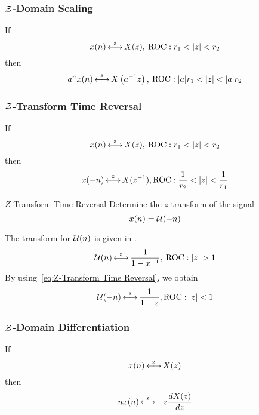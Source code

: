 \subsubsection{\texorpdfstring{$\operatorname{\mathcal{Z}}$-Domain}{Z-Domain} Scaling}\label{subsubsec:Z-Domain Scaling}
If
\begin{equation*}
  x(n) \operatorname{\overset{z}{\longleftrightarrow}} X(z), \> \operatorname{\mathrm{ROC}}: r_{1}< \lvert z \rvert < r_{2}
\end{equation*}
then
\begin{equation}\label{eq:Z-Domain Scaling}
  a^{n}x(n) \operatorname{\overset{z}{\longleftrightarrow}} X \left( a^{-1}z \right), \> \operatorname{\mathrm{ROC}}: \lvert a \rvert r_{1} < \lvert z \rvert < \lvert a \rvert r_{2}
\end{equation}

\subsubsection{\texorpdfstring{$\operatorname{\mathcal{Z}}$-Transform}{Z-Transform} Time Reversal}\label{subsubsec:Z-Transform Time Reversal}
If
\begin{equation*}
  x(n) \operatorname{\overset{z}{\longleftrightarrow}} X(z), \> \operatorname{\mathrm{ROC}}: r_{1}< \lvert z \rvert < r_{2}
\end{equation*}
then
\begin{equation}\label{eq:Z-Transform Time Reversal}
  x(-n) \operatorname{\overset{z}{\longleftrightarrow}} X(z^{-1}), \operatorname{\mathrm{ROC}}: \frac{1}{r_{2}} < \lvert z \rvert < \frac{1}{r_{1}}
\end{equation}

\begin{example}[Example 3.2.6]{\texorpdfstring{$Z$-Transform}{Z-Transform} Time Reversal}
  Determine the $z$-transform of the signal
  \begin{equation*}
    x(n) = \operatorname{\mathcal{U}}(-n)
  \end{equation*}

  \tcblower

  The transform for $\operatorname{\mathcal{U}}(n)$ is given in .
  \begin{equation*}
    \operatorname{\mathcal{U}}(n) \operatorname{\overset{z}{\longleftrightarrow}} \frac{1}{1-x^{-1}}, \> \operatorname{\mathrm{ROC}}: \lvert z \rvert > 1
  \end{equation*}
  By using~\eqref{eq:Z-Transform Time Reversal}, we obtain
  \begin{equation*}
    \operatorname{\mathcal{U}}(-n) \operatorname{\overset{z}{\longleftrightarrow}} \frac{1}{1-z}, \operatorname{\mathrm{ROC}}: \lvert z \rvert < 1
  \end{equation*}
\end{example}

\subsubsection{\texorpdfstring{$\operatorname{\mathcal{Z}}$-Domain}{Z-Domain} Differentiation}\label{subsubsec:Z-Domain Differentiation}
If
\begin{equation*}
  x(n) \operatorname{\overset{z}{\longleftrightarrow}} X(z)
\end{equation*}
then
\begin{equation}\label{eq:Z-Domain Differentiation}
  nx(n) \operatorname{\overset{z}{\longleftrightarrow}} -z \frac{dX(z)}{dz}
\end{equation}

